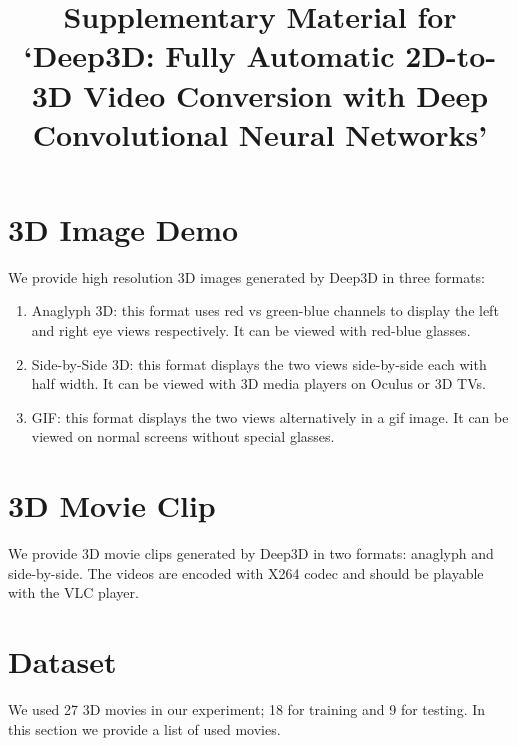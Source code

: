 \documentclass{article}
\begin{document}
\title{Supplementary Material for `Deep3D: Fully Automatic 2D-to-3D Video Conversion with Deep Convolutional Neural Networks'}
\date{}
\maketitle

\section{3D Image Demo}
We provide high resolution 3D images generated by Deep3D in three formats:
\begin{enumerate}
\item Anaglyph 3D: this format uses red vs green-blue channels to display the left and right eye views respectively.
It can be viewed with red-blue glasses.
\item Side-by-Side 3D: this format displays the two views side-by-side each with half width. It can be viewed with 3D media players on Oculus or 3D TVs.
\item GIF: this format displays the two views alternatively in a gif image. It can be viewed on normal screens without special glasses.
\end{enumerate}

\section{3D Movie Clip}
We provide 3D movie clips generated by Deep3D in two formats: anaglyph and side-by-side. The videos are encoded with X264 codec and should be playable with the VLC player.

\section{Dataset}
We used 27 3D movies in our experiment; 18 for training and 9 for testing. In this section we provide a list of used movies.
\end{document}
